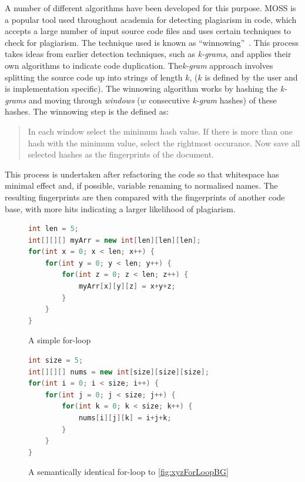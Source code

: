 A number of different algorithms have been developed for this purpose.
MOSS is a popular tool used throughout academia for detecting plagiarism
in code, which accepts a large number of input source code files and uses certain
techniques to check for plagiarism. The technique used is known as 
``winnowing''~\cite{winnowing}. This process takes ideas from earlier detection
techniques, such as \emph{k-grams}, and applies their own algorithms to indicate
code duplication. The\emph{k-gram} approach involves splitting the source code up into
strings of length $k$, ($k$ is defined by the user and is implementation specific).
The winnowing algorithm works by hashing the \emph{k-grams} and moving through 
\emph{windows} ($w$ consecutive \emph{k-gram} hashes)
of these hashes.
The winnowing step is the defined as: 
\begin{quote}In each window select the minimum hash value.
If there is more than one hash with the minimum value, select the rightmost
occurance. Now save all selected hashes as the fingerprints of the document.
\cite{winnowing}
\end{quote}

This process is undertaken after refactoring the code so that whitespace
has minimal effect and, if possible, variable renaming to normalised names.
The resulting fingerprints are then compared with the fingerprints of another
code base, with more hits indicating a larger likelihood of plagiarism.

\begin{figure}[H]
\begin{minipage}[b]{0.45\linewidth}
\begin{lstlisting}[language=Java]
int len = 5;
int[][][] myArr = new int[len][len][len];
for(int x = 0; x < len; x++) {
	for(int y = 0; y < len; y++) {
		for(int z = 0; z < len; z++) {
			myArr[x][y][z] = x+y+z;
		}
	}
}
\end{lstlisting}
\caption{A simple for-loop}
\label{fig:xyzForLoopBG}
\end{minipage}
\hspace{0.5cm}
\begin{minipage}[b]{0.45\linewidth}
\begin{lstlisting}[language=Java]
int size = 5;
int[][][] nums = new int[size][size][size];
for(int i = 0; i < size; i++) {
	for(int j = 0; j < size; j++) {
		for(int k = 0; k < size; k++) {
			nums[i][j][k] = i+j+k;
		}
	}
}
\end{lstlisting}
\caption{A semantically identical for-loop to \cref{fig:xyzForLoopBG}}
\label{fig:ijkForLoopBG}
\end{minipage}
\end{figure}

